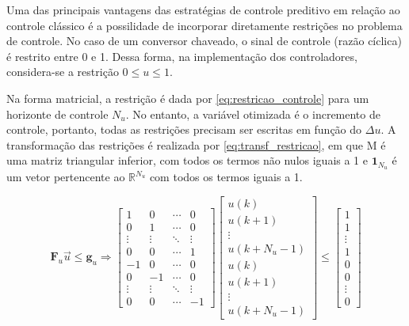 \documentclass{article}
\begin{document}
Uma das principais vantagens das estratégias de controle preditivo em relação ao controle clássico é a possilidade de incorporar diretamente restrições no problema de controle. No caso de um conversor chaveado, o sinal de controle (razão cíclica) é restrito entre 0 e 1. Dessa forma, na implementação dos controladores, considera-se a restrição \(0 \leq u \leq 1\).

Na forma matricial, a restrição é dada por \eqref{eq:restricao_controle} para um horizonte de controle \(N_u\). No entanto, a variável otimizada é o incremento de controle, portanto, todas as restrições precisam ser escritas em função do \(\Delta u\). A transformação das restrições é realizada por \eqref{eq:transf_restricao}, em que M é uma matriz triangular inferior, com todos os termos não nulos iguais a 1 e \(\mathbf{1}_{N_u}\) é um vetor pertencente ao \(\mathbb{R}^{N_u}\) com todos os termos iguais a 1.

\begin{equation} \mathbf{F}_u \vec{u} \leq \mathbf{g}_u \Rightarrow
  \begin{bmatrix}
    1      & 0      & \cdots & 0      \\
    0      & 1      & \cdots & 0      \\
    \vdots & \vdots & \ddots & \vdots \\
    0      & 0      & \cdots & 1      \\
    -1     & 0      & \cdots & 0      \\
    0      & -1     & \cdots & 0      \\
    \vdots & \vdots & \ddots & \vdots \\
    0      & 0      & \cdots & -1
  \end{bmatrix}
  \begin{bmatrix}
    u(k)       \\
    u(k+1)     \\
    \vdots     \\
    u(k+N_u-1) \\
    u(k)       \\
    u(k+1)     \\
    \vdots     \\
    u(k+N_u-1)
  \end{bmatrix}
  \le
  \begin{bmatrix}
    1      \\
    1      \\
    \vdots \\
    1      \\
    0      \\
    0      \\
    \vdots \\
    0
  \end{bmatrix}
  \label{eq:restricao_controle}
\end{equation}
\end{document}
